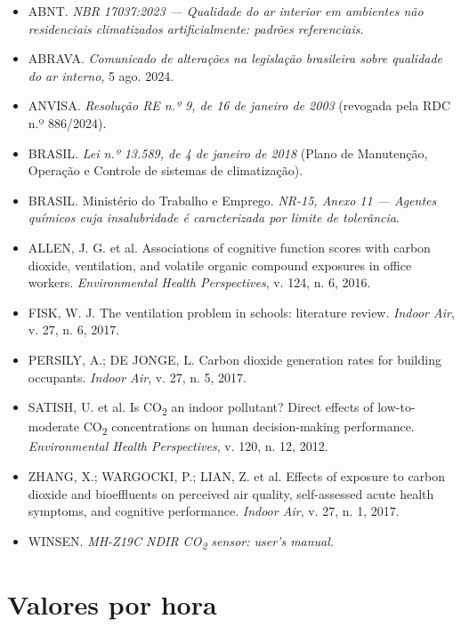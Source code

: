 \documentclass[11pt,a4paper]{article}
\begin{document}
{\small\raggedright
\begin{itemize}[leftmargin=*]
\item ABNT. \emph{NBR 17037:2023 --- Qualidade do ar interior em ambientes não residenciais climatizados artificialmente: padrões referenciais}.
\item ABRAVA. \emph{Comunicado de alterações na legislação brasileira sobre qualidade do ar interno}, 5 ago. 2024.
\item ANVISA. \emph{Resolução RE n.º 9, de 16 de janeiro de 2003} (revogada pela RDC n.º 886/2024).
\item BRASIL. \emph{Lei n.º 13.589, de 4 de janeiro de 2018} (Plano de Manutenção, Operação e Controle de sistemas de climatização).
\item BRASIL. Ministério do Trabalho e Emprego. \emph{NR-15, Anexo 11 --- Agentes químicos cuja insalubridade é caracterizada por limite de tolerância}.
\item ALLEN, J. G. et al. Associations of cognitive function scores with carbon dioxide, ventilation, and volatile organic compound exposures in office workers. \emph{Environmental Health Perspectives}, v. 124, n. 6, 2016.
\item FISK, W. J. The ventilation problem in schools: literature review. \emph{Indoor Air}, v. 27, n. 6, 2017.
\item PERSILY, A.; DE JONGE, L. Carbon dioxide generation rates for building occupants. \emph{Indoor Air}, v. 27, n. 5, 2017.
\item SATISH, U. et al. Is CO\textsubscript{2} an indoor pollutant? Direct effects of low-to-moderate CO\textsubscript{2} concentrations on human decision-making performance. \emph{Environmental Health Perspectives}, v. 120, n. 12, 2012.
\item ZHANG, X.; WARGOCKI, P.; LIAN, Z. et al. Effects of exposure to carbon dioxide and bioeffluents on perceived air quality, self-assessed acute health symptoms, and cognitive performance. \emph{Indoor Air}, v. 27, n. 1, 2017.
\item WINSEN. \emph{MH-Z19C NDIR CO\textsubscript{2} sensor: user's manual}.
\end{itemize}
}

\appendix
\section{Valores por hora}
\label{sec:horas}
\end{document}
